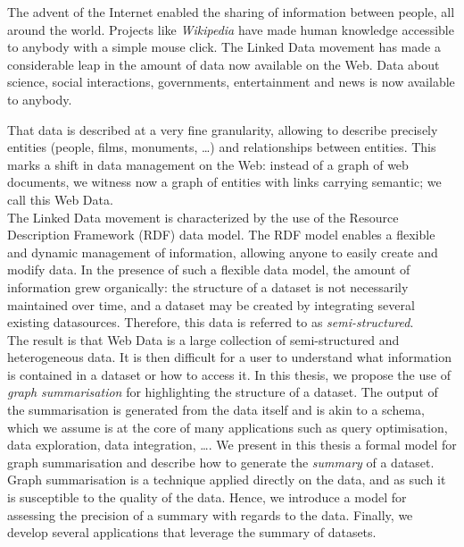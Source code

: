 The advent of the Internet enabled the sharing of information between people, all around the world. Projects like \emph{Wikipedia} have made human knowledge accessible to anybody with a simple mouse click. The Linked Data movement has made a considerable leap in the amount of data now available on the Web. Data about science, social interactions, governments, entertainment and news is now available to anybody.

That data is described at a very fine granularity, allowing to describe precisely entities (people, films, monuments, \ldots) and relationships between entities. This marks a shift in data management on the Web: instead of a graph of web documents, we witness now a graph of entities with links carrying semantic; we call this Web Data.\\

The Linked Data movement is characterized by the use of the Resource Description Framework (RDF) data model. The RDF model enables a flexible and dynamic management of information, allowing anyone to easily create and modify data. In the presence of such a flexible data model, the amount of information grew organically: the structure of a dataset is not necessarily maintained over time, and a dataset may be created by integrating several existing datasources. Therefore, this data is referred to as \emph{semi-structured}.\\

The result is that Web Data is a large collection of semi-structured and heterogeneous data. It is then difficult for a user to understand what information is contained in a dataset or how to access it. In this thesis, we propose the use of \emph{graph summarisation} for highlighting the structure of a dataset. The output of the summarisation is generated from the data itself and is akin to a schema, which we assume is at the core of many applications such as query optimisation, data exploration, data integration, \ldots.
We present in this thesis a formal model for graph summarisation and describe how to generate the \emph{summary} of a dataset. Graph summarisation is a technique applied directly on the data, and as such it is susceptible to the quality of the data. Hence, we introduce a model for assessing the precision of a summary with regards to the data. Finally, we develop several applications that leverage the summary of datasets.
